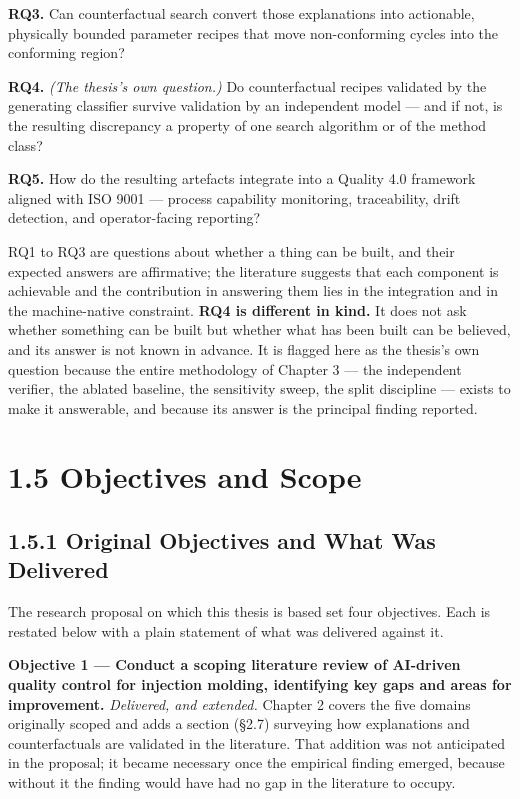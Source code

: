 \textbf{RQ3.} Can counterfactual search convert those explanations into actionable, physically bounded parameter recipes that move non-conforming cycles into the conforming region?

\textbf{RQ4.} \emph{(The thesis's own question.)} Do counterfactual recipes validated by the generating classifier survive validation by an independent model --- and if not, is the resulting discrepancy a property of one search algorithm or of the method class?

\textbf{RQ5.} How do the resulting artefacts integrate into a Quality 4.0 framework aligned with ISO 9001 --- process capability monitoring, traceability, drift detection, and operator-facing reporting?

RQ1 to RQ3 are questions about whether a thing can be built, and their expected answers are affirmative; the literature suggests that each component is achievable and the contribution in answering them lies in the integration and in the machine-native constraint. \textbf{RQ4 is different in kind.} It does not ask whether something can be built but whether what has been built can be believed, and its answer is not known in advance. It is flagged here as the thesis's own question because the entire methodology of Chapter 3 --- the independent verifier, the ablated baseline, the sensitivity sweep, the split discipline --- exists to make it answerable, and because its answer is the principal finding reported.

\hypertarget{objectives-and-scope}{%
\section{1.5 Objectives and Scope}\label{objectives-and-scope}}

\hypertarget{original-objectives-and-what-was-delivered}{%
\subsection{1.5.1 Original Objectives and What Was Delivered}\label{original-objectives-and-what-was-delivered}}

The research proposal on which this thesis is based set four objectives. Each is restated below with a plain statement of what was delivered against it.

\textbf{Objective 1 --- Conduct a scoping literature review of AI-driven quality control for injection molding, identifying key gaps and areas for improvement.}
\emph{Delivered, and extended.} Chapter 2 covers the five domains originally scoped and adds a section (§2.7) surveying how explanations and counterfactuals are validated in the literature. That addition was not anticipated in the proposal; it became necessary once the empirical finding emerged, because without it the finding would have had no gap in the literature to occupy.

